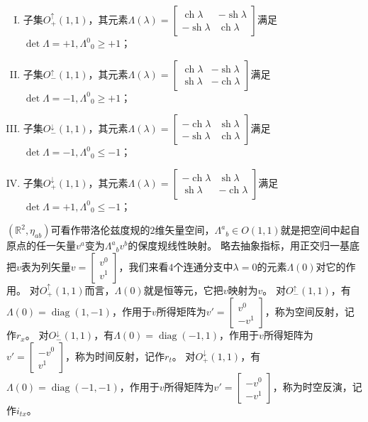 \begin{enumerate}[(I)]
    \item 子集$O^\uparrow_+(1, 1)$，其元素$\Lambda(\lambda) = \begin{bmatrix}
    \operatorname{ch}\lambda & -\operatorname{sh}\lambda \\
    -\operatorname{sh}\lambda & \operatorname{ch}\lambda
    \end{bmatrix}$满足$\det \Lambda = +1, \Lambda^0{}_0 \geq +1$；
    \item 子集$O^\uparrow_-(1, 1)$，其元素$\Lambda(\lambda) = \begin{bmatrix}
    \operatorname{ch}\lambda & -\operatorname{sh}\lambda \\
    \operatorname{sh}\lambda & -\operatorname{ch}\lambda
    \end{bmatrix}$满足$\det \Lambda = -1, \Lambda^0{}_0 \geq +1$；
    \item 子集$O^\downarrow_-(1, 1)$，其元素$\Lambda(\lambda) = \begin{bmatrix}
    -\operatorname{ch}\lambda & \operatorname{sh}\lambda \\
    -\operatorname{sh}\lambda & \operatorname{ch}\lambda
    \end{bmatrix}$满足$\det \Lambda = -1, \Lambda^0{}_0 \leq -1$；
    \item 子集$O^\downarrow_+(1, 1)$，其元素$\Lambda(\lambda) = \begin{bmatrix}
    -\operatorname{ch}\lambda & \operatorname{sh}\lambda \\
    \operatorname{sh}\lambda & -\operatorname{ch}\lambda
    \end{bmatrix}$满足$\det \Lambda = +1, \Lambda^0{}_0 \leq -1$；
\end{enumerate}

$(\mathbb{R}^2, \eta_{ab})$可看作带洛伦兹度规的$2$维矢量空间，$\Lambda^a{}_b \in O(1, 1)$就是把空间中起自原点的任一矢量$v^a$变为$\Lambda^a{}_bv^b$的保度规线性映射。
略去抽象指标，用正交归一基底把$v$表为列矢量$v = \begin{bmatrix}
    v^0 \\
    v^1
\end{bmatrix}$，我们来看$4$个连通分支中$\lambda = 0$的元素$\Lambda(0)$对它的作用。
对$O^\uparrow_+(1, 1)$而言，$\Lambda(0)$就是恒等元，它把$v$映射为$v$。
对$O^\uparrow_-(1, 1)$，有$\Lambda(0) = \operatorname{diag}(1, -1)$，作用于$v$所得矩阵为$v' = \begin{bmatrix}
    v^0 \\
    -v^1
\end{bmatrix}$，称为空间反射，记作$r_x$。
对$O^\downarrow_-(1, 1)$，有$\Lambda(0) = \operatorname{diag}(-1, 1)$，作用于$v$所得矩阵为$v' = \begin{bmatrix}
    -v^0 \\
    v^1
\end{bmatrix}$，称为时间反射，记作$r_t$。
对$O^\downarrow_+(1, 1)$，有$\Lambda(0) = \operatorname{diag}(-1, -1)$，作用于$v$所得矩阵为$v' = \begin{bmatrix}
    -v^0 \\
    -v^1
\end{bmatrix}$，称为时空反演，记作$i_{tx}$。

